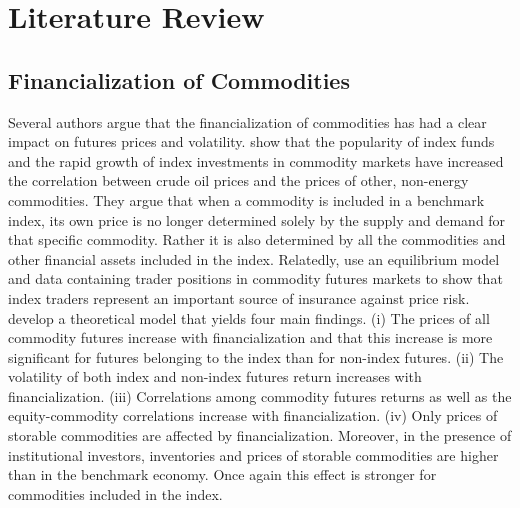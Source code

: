 \documentclass[12pt]{article}
\begin{document}

\section{Literature Review}

\subsection{Financialization of Commodities}

Several authors argue that the financialization of commodities has had a clear impact on futures prices and volatility. \citet{tang2012index} show that the popularity of index funds and the rapid growth of index investments in commodity markets have increased the correlation between crude oil prices and the prices of other, non-energy commodities. They argue that when a commodity is included in a benchmark index, its own price is no longer determined solely by the supply and demand for that specific commodity. Rather it is also determined by all the commodities and other financial assets included in the index. Relatedly, \citet{brunetti2014commodity}  use an equilibrium model and data containing trader positions in commodity futures markets to show that index traders represent an important source of insurance against price risk.   \citet{basak2016model} develop a theoretical model that yields four main findings. (i) The prices of all commodity futures increase with financialization and that this increase is more significant for futures belonging to the index than for non-index futures. (ii) The volatility of both index and non-index futures return increases with financialization. (iii) Correlations among commodity futures returns as well as the equity-commodity correlations increase with financialization. (iv) Only prices of storable commodities are affected by financialization. Moreover, in the presence of institutional investors, inventories and prices of storable commodities are higher than in the benchmark economy. Once again this effect is stronger for commodities included in the index.
\end{document}
